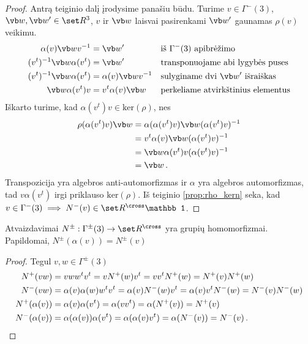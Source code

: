\begin{proof}
	Antrą teiginio dalį įrodysime panašiu būdu.
	Turime $v \in \Gamma^-(3)$, $\vb w, \vb w' \in \set R^3$,
	$v$ ir $\vb w$ laisvai pasirenkami $\vb w'$ gaunamas $\rho(v)$ veikimu.
	\begin{equation}
		\begin{aligned}
			\alpha(v)\vb w v^{-1} &= \vb w'
			&&\text{iš $\Gamma^-(3)$ apibrėžimo}
			\\
			(v^t)^{-1}  \vb w  \alpha(v^t) &= \vb w'
			&&\text{transponuojame abi lygybės puses}
			\\
			(v^t)^{-1}  \vb w  \alpha(v^t) &= \alpha(v)\vb w v^{-1}
			&&\text{sulyginame dvi $\vb w'$ išraiškas}
			\\
			\vb w  \alpha(v^t) v &= v^t \alpha(v)\vb w 
			&&\text{perkeliame atvirkštinius elementus}
		\end{aligned}
	\end{equation}
	Iškarto turime, kad $\alpha(v^t) v \in \mathup{ker}(\rho)$, nes
	\begin{equation}
		\begin{aligned}
			\rho(\alpha(v^t) v)\vb w 
			&= \alpha(\alpha(v^t) v)\vb w (\alpha(v^t) v)^{-1}
			\\&= v^t \alpha(v) \vb w (\alpha(v^t) v)^{-1}
			\\&= \vb w  \alpha(v^t) v (\alpha(v^t) v)^{-1}
			\\&= \vb w 
			\,.
		\end{aligned}
	\end{equation}
	Transpozicija yra algebros anti-automorfizmas
	ir $\alpha$ yra algebros automorfizmas,
	tad $v \alpha(v^t)$ irgi priklauso $\mathup{ker}(\rho)$.
	Iš teiginio \ref{prop:rho_kern} seka,
	kad $v \in \Gamma^-(3) \implies N^-(v) \in \set R^{\cross} \mathbb1$.
\end{proof}

\begin{proposition}
	Atvaizdavimai $N^\pm: \Gamma^\pm(3) \to \set R^{\cross}$
	yra grupių homomorfizmai.
	Papildomai, $N^\pm(\alpha(v)) = N^\pm(v)$
\end{proposition}
\begin{proof}
	Tegul $v,w \in \Gamma^\pm(3)$
	\begin{equation}
		\begin{aligned}
			N^+(vw) &= v w w^t v^t = v N^+(w) v^t = v v^t N^+(w) = N^+(v) N^+(w)
			\\
			N^-(vw) &= \alpha(v) \alpha(w) w^t v^t = \alpha(v) N^-(w) v^t = \alpha(v) v^t N^-(w)  = N^-(v) N^-(w)
			\\
			N^+(\alpha(v)) &= \alpha(v) \alpha(v^t) = \alpha(v v^t) = \alpha(N^+(v)) = N^+(v)
			\\
			N^-(\alpha(v)) &= \alpha(\alpha(v)) \alpha(v^t) = \alpha(\alpha(v) v^t) = \alpha(N^-(v)) = N^-(v)
			\,. \qedhere
		\end{aligned}
	\end{equation}
\end{proof}

